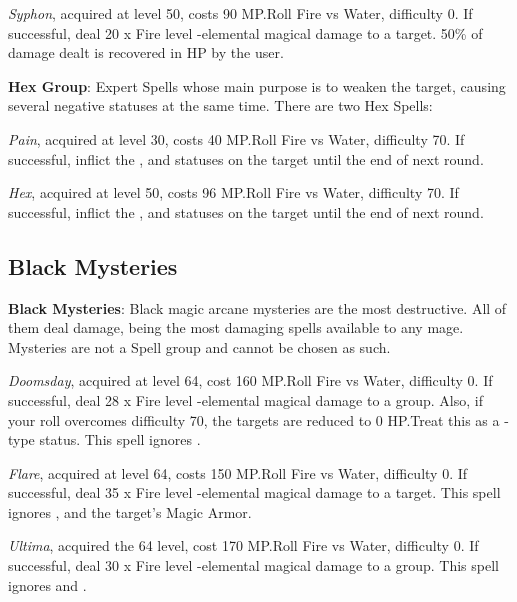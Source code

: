 \begin{multicols}{2}
    \textit{Syphon}, acquired at level 50, costs 90 MP.\@{}Roll Fire vs Water, difficulty 0. If successful, deal 20 x Fire level -elemental magical damage to a target. 50\% of damage dealt is recovered in HP by the user.
    
    \textbf{Hex Group}: Expert Spells whose main purpose is to weaken the target, causing several negative statuses at the same time. There are two Hex Spells:
    
    \textit{Pain}, acquired at level 30, costs 40 MP.\@{}Roll Fire vs Water, difficulty 70. If successful, inflict the ,  and  statuses on the target until the end of next round.
    
    \textit{Hex}, acquired at level 50, costs 96 MP.\@{}Roll Fire vs Water, difficulty 70. If successful, inflict the ,  and  statuses on the target until the end of next round.
    
    \subsection{Black Mysteries}\label{subsec:black-mysteries}

    \textbf{Black Mysteries}: Black magic arcane mysteries are the most destructive. All of them deal damage, being the most damaging spells available to any mage. Mysteries are not a Spell group and cannot be chosen as such.
    
    \textit{Doomsday}, acquired at level 64, cost 160 MP.\@{}Roll Fire vs Water, difficulty 0. If successful, deal 28 x Fire level -elemental magical damage to a group. Also, if your roll overcomes difficulty 70, the targets are reduced to 0 HP.\@{}Treat this as a -type status.  This spell ignores .
    
    \textit{Flare}, acquired at level 64, costs 150 MP.\@{}Roll Fire vs Water, difficulty 0. If successful, deal 35 x Fire level -elemental magical damage to a target. This spell ignores ,  and the target’s Magic Armor.  
    
    \textit{Ultima}, acquired the 64 level, cost 170 MP.\@{}Roll Fire vs Water, difficulty 0. If successful, deal 30 x Fire level -elemental magical damage to a group. This spell ignores  and . 

\end{multicols}

